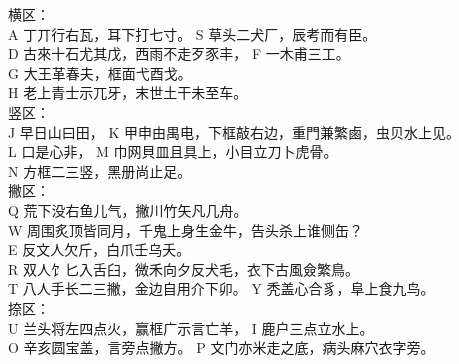 \documentclass{ctexart}
\begin{document}
    \vspace{5mm}

        \fontsize{16pt}{16pt} \selectfont 


\begin{multicols}{2}
    横区：\\
    A 丁丌行右瓦，耳下打七寸。 S 草头二犬厂，辰考而有臣。\\
D 古來十石尤其戊，西雨不走歹豕丰， F 一木甫三工。\\
G 大王革春夫，框面弋酉戈。\\
H 老上青士示兀牙，末世土干未至车。\\
\vspace{12pt}
竖区：\\
J 早日山曰田， K 甲申由禺电，下框敲右边，重門兼繁鹵，虫贝水上见。\\
L 口是心非， M 巾网貝皿且具上，小目立刀卜虎骨。\\
N 方框二三竖，黑册尚止足。\\

撇区：\\
Q 荒下没右鱼儿气，撇川竹矢凡几舟。 \\
W 周围炙顶皆同月，千鬼上身生金牛，告头杀上谁侧缶？\\
E 反文人欠斤，白爪壬乌夭。\\
R 双人饣匕入舌臼，微禾向夕反犬毛，衣下古風僉繁鳥。\\
T 八人手长二三撇，金边自用介下卯。 Y 秃盖心合豸，阜上食九鸟。\\
\vspace{12pt}
捺区：\\
U 兰头将左四点火，赢框广示言亡羊， I 鹿户三点立水上。\\
O 辛亥圆宝盖，言旁点撇方。 P 文门亦米走之底，病头麻穴衣字旁。\\
    \end{multicols}
            
\end{document}
